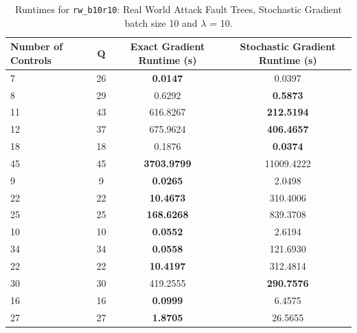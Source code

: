\documentclass{article}
\begin{document}
\begin{table}[h]
\centering
\begin{tabular}{lccc}
\toprule
Number of Controls & Q & Exact Gradient Runtime (s) & Stochastic Gradient Runtime (s) \\
\midrule
7 & 26 & \textbf{0.0147} & 0.0397 \\
8 & 29 & 0.6292 & \textbf{0.5873} \\
11 & 43 & 616.8267 & \textbf{212.5194} \\
12 & 37 & 675.9624 & \textbf{406.4657} \\
18 & 18 & 0.1876 & \textbf{0.0374} \\
45 & 45 & \textbf{3703.9799} & 11009.4222 \\
9 & 9 & \textbf{0.0265} & 2.0498 \\
22 & 22 & \textbf{10.4673} & 310.4006 \\
25 & 25 & \textbf{168.6268} & 839.3708 \\
10 & 10 & \textbf{0.0552} & 2.6194 \\
34 & 34 & \textbf{0.0558} & 121.6930 \\
22 & 22 & \textbf{10.4197} & 312.4814 \\
30 & 30 & 419.2555 & \textbf{290.7576} \\
16 & 16 & \textbf{0.0999} & 6.4575 \\
27 & 27 & \textbf{1.8705} & 26.5655 \\
\bottomrule
\end{tabular}
\caption{Runtimes for \texttt{rw\_b10r10}: Real World Attack Fault Trees, Stochastic Gradient batch size 10 and $\lambda$ = 10.}
\end{table}
\end{document}
